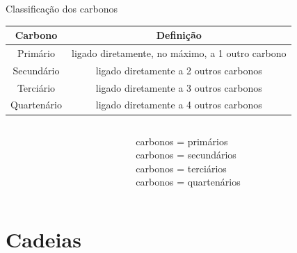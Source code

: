 \documentclass[presentation,professionalfonts,smaller,aspectratio=169]{beamer}
\begin{document}
\begin{frame}[label={sec:org3ee99aa}]{Classificação dos carbonos}
\begin{center}
\begin{tabular}{|c|c|}
\hline
\cellcolor{green!20} {\bfseries Carbono}  & \cellcolor{green!20} {\bfseries Definição} \\[0pt]
\hline
Primário & ligado diretamente, \alert{no máximo}, a \alert{1} outro carbono\\[0pt]
\hline
Secundário & ligado diretamente a \alert{2} outros carbonos\\[0pt]
\hline
Terciário & ligado diretamente  a \alert{3} outros carbonos\\[0pt]
\hline
Quartenário & ligado diretamente a \alert{4} outros carbonos\\[0pt]
\hline
\end{tabular}
\end{center}



\begin{columns}
\begin{column}{0.7\textwidth}
\chemmove{
\node[bal,fit=(A)]{};
\node[bal,fit=(B)]{};
\node[bal,fit=(D)]{};
\node[bal,fit=(E)]{};
\node[rect,fit=(F)]{};
\node[rect,fit=(G)]{};
\node[rect,fit=(H)]{};
\node[rect,fit=(I)]{};
\node[rect,fit=(J)]{};
\node[rect,fit=(K)]{};
\node[bal2,fit=(L)]{};
\node[bal2,fit=(M)]{};
\node[bal3,fit=(N)]{};
}
\end{column}
\begin{column}{0.3\textwidth}  %
      carbonos  = primários\\
      carbonos  = secundários\\
      carbonos  = terciários\\
      carbonos  = quartenários
     \chemmove{
      \node[bal,fit=(A)]{};
      \node[rect,fit=(B)]{};
      \node[bal2,fit=(D)]{};
      \node[bal3,fit=(E)]{};
      }
\end{column}
\end{columns}
\end{frame}


\section{Cadeias}
\label{sec:org056cea9}
\end{document}
